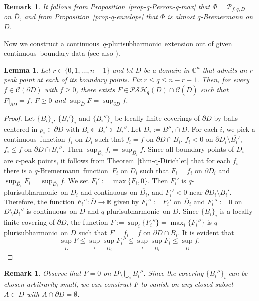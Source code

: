 \documentclass[10pt,a4paper]{amsart}
\newtheorem{lem}[thm]{Lemma}
\newtheorem{rem}[thm]{Remark}
\numberwithin{equation}{section}
\newcommand{\cbb}{\mathbb{C}}
\newcommand{\rbb}{\mathbb{R}}
\newcommand{\ccal}{\mathcal{C}}
\newcommand{\pcal}{\mathcal{P}}
\newcommand{\qbrem}{$q$-Bremermann}
\newcommand{\qpsh}{$q$-pluri\-sub\-harmonic}
\newcommand{\PSH}{\mathcal{PSH}}
\newcommand{\cl}[1]{\overline{#1}}
\newcommand{\cont}{continuous}
\newcommand{\fct}{function}
\newcommand{\cld}{\overline{D}}
\newcommand{\relc}{\Subset}
\begin{document}
\begin{rem} It follows from Proposition~\ref{prop-q-Perron-q-max} that $\Phi=\pcal_{f,q,D}$ on $\cld$, and from Proposition~\ref{prop-q-envelope} that $\Phi$ is almost $q$-Bremermann on $\cld$.
\end{rem}



Now we construct a \cont\ \qpsh\ extension out of given \cont\ boundary data (see also \cite{HST}).

\begin{lem}\label{lem-qpsh-extension} Let $r \in \{0,1,\ldots,n-1\}$ and let $D$ be a domain in $\cbb^n$ that admits an $r$-peak point at each of its boundary points. Fix $r \leq q \leq n-r-1$. Then, for every $f\in\ccal(\partial D)$ with $f \geq 0$, there exists $F \in \PSH_q(D) \cap \ccal(\cld)$ such that $F|_{\partial D}=f$, $F\geq0$ and $\sup_{\cld} F = \sup_{\partial D} f$.
\end{lem}

\begin{proof} Let $\{B_i\}_i$, $\{B_i'\}_i$ and $\{B_i''\}_i$ be locally finite coverings of $\partial D$ by balls centered in $p_i \in \partial D$ with $B_i \relc B_i' \relc B_i''$. Let $D_i:=B''_i \cap D$. For each $i$, we pick a \cont\ function $f_i$ on $\overline{D_i}$ such that $f_i=f$ on $\partial D\cap\overline{B}_i$,  $f_i < 0$ on $\partial D_i \setminus \overline{B_i'}$, $f_i\leq f$ on $\partial D \cap B_i''$. Then $\sup_{\overline{D_i}} f_i = \sup_{\overline{D_i}} f$. Since all boundary points of $D_i$ are $r$-peak points, it follows from  Theorem~\ref{thm-q-Dirichlet} that for each $f_i$ there is a \qbrem\ \fct\ $F_i$ on $\overline{D_i}$ such that $F_i=f_i$ on $\partial D_i$ and $\sup_{\overline{D_i}} F_i = \sup_{\overline{D_i}} f$. We set $F_i':=\max\{ F_i, 0\}$. Then $F_i'$ is \qpsh\ on $D_i$ and \cont\ on $\cl{D_i}$, and $F_i'<0$ near $\partial D_i\setminus B_i'$. Therefore, the function $F_i'':\cld \to \rbb$ given by $F_i'':=F_i'$ on $\overline{D_i}$ and $F_i'':=0$ on $\cld\setminus B_i''$ is \cont\ on $\cld$ and \qpsh\ on $D$. Since $\{B_i\}_i$ is a locally finite covering of $\partial D$, the function $F:=\sup_i\{F_i''\}=\max_i\{ F_i''\}$ is \qpsh\ on $D$ such that $F=f_i=f$ on $\partial D \cap B_i$. It is evident that
\[
\sup_{\cld} F \leq \sup_i \sup_{\overline{D_i}} F_i'' \leq \sup_{i}\sup_{\overline{D_i}} F_i \leq \sup_{\cl{D}} f.
\]
\end{proof}

\begin{rem} Observe that $F=0$ on $D\setminus \bigcup_i B_i''$. Since the covering $\{B_i''\}_i$ can be chosen arbitrarily small, we can construct $F$ to vanish on any closed subset $A \subset D$ with $A \cap \partial D = \emptyset$.
\end{rem}
\end{document}
